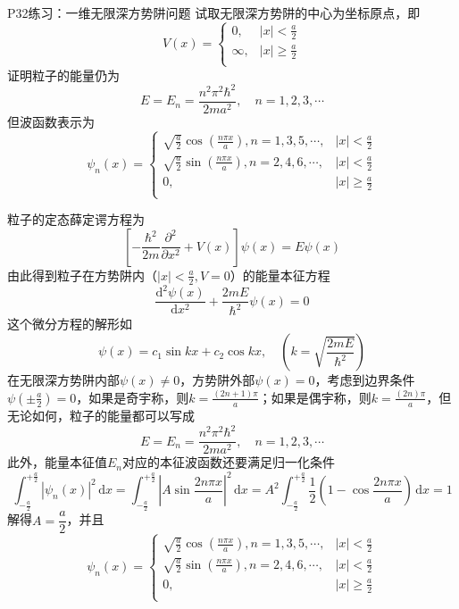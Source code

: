 \begin{question}{P32练习：一维无限深方势阱问题}
    试取无限深方势阱的中心为坐标原点，即
    $$
        V(x)=\begin{cases}
            0,      & |x|<\frac{a}{2}          \\
            \infty, & |x|\geqslant \frac{a}{2} \\
        \end{cases}
    $$
    证明粒子的能量仍为
    $$
        E = E_n = \frac{n^2\pi^2\hbar^2}{2ma^2}, \quad n=1,2,3,\cdots
    $$
    但波函数表示为
    $$
        \psi_n(x) = \begin{cases}
            \sqrt{\frac{a}{2}}\cos\left(\frac{n\pi x}{a}\right), n=1,3,5,\cdots, & |x|<\frac{a}{2}         \\
            \sqrt{\frac{a}{2}}\sin\left(\frac{n\pi x}{a}\right), n=2,4,6,\cdots, & |x|<\frac{a}{2}         \\
            0,                                                                   & |x|\geqslant\frac{a}{2} \\
        \end{cases}
    $$
\end{question}
\begin{solution}
    粒子的定态薛定谔方程为
    $$
        \left[-\frac{\hbar^2}{2m}\frac{\partial^2}{\partial x^2}+V(x)\right]\psi(x) = E\psi(x)
    $$
    由此得到粒子在方势阱内（$|x|<\frac{a}{2}, V=0$）的能量本征方程
    $$
        \frac{\mathrm{d}^2\psi(x)}{\mathrm{d}x^2}+\frac{2mE}{\hbar^2}\psi(x)=0
    $$
    这个微分方程的解形如
    $$
        \psi(x)=c_1\sin{kx}+c_2\cos{kx},
        \quad
        \left(k=\sqrt{\frac{2mE}{\hbar^2}}\right)
    $$
    在无限深方势阱内部$\psi(x)\neq0$，方势阱外部$\psi(x)=0$，考虑到边界条件$\psi\left(\pm\frac{a}{2}\right)=0$，如果是奇宇称，则$k=\frac{(2n+1)\pi}{a}$；如果是偶宇称，则$k=\frac{(2n)\pi}{a}$，但无论如何，粒子的能量都可以写成
    $$
        E=E_n=\frac{n^2\pi^2\hbar^2}{2ma^2}, \quad n=1, 2, 3, \cdots
    $$
    此外，能量本征值$E_n$对应的本征波函数还要满足归一化条件
    $$
        \int_{-\frac{a}{2}}^{+\frac{a}{2}}|\psi_n(x)|^2\,\mathrm{d}x
        = \int_{-\frac{a}{2}}^{+\frac{a}{2}}\left|A\sin\frac{2n\pi x}{a}\right|^2\,\mathrm{d}x
        = A^2\int_{-\frac{a}{2}}^{+\frac{a}{2}}\frac{1}{2}\left(1-\cos\frac{2n\pi x}{a}\right)\,\mathrm{d}x
        = 1
    $$
    解得$A=\dfrac{a}{2}$，并且 %
    $$
        \psi_n(x) = \begin{cases}
            \sqrt{\frac{a}{2}}\cos\left(\frac{n\pi x}{a}\right), n=1,3,5,\cdots, & |x|<\frac{a}{2}         \\
            \sqrt{\frac{a}{2}}\sin\left(\frac{n\pi x}{a}\right), n=2,4,6,\cdots, & |x|<\frac{a}{2}         \\
            0,                                                                   & |x|\geqslant\frac{a}{2} \\
        \end{cases}
    $$
\end{solution}




